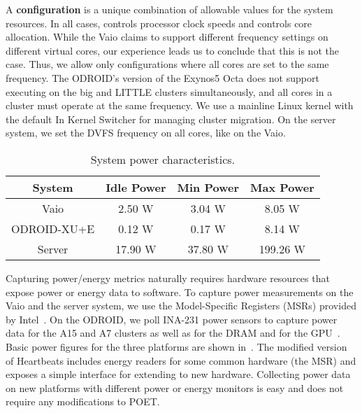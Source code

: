 A \textbf{configuration} is a unique combination of allowable values for the system resources.
In all cases,  controls processor clock speeds and  controls core allocation.
While the Vaio claims to support different frequency settings on different virtual cores, our experience leads us to conclude that this is not the case.
Thus, we allow only configurations where all cores are set to the same frequency.
The ODROID's version of the Exynos5 Octa does not support executing on the big and LITTLE clusters simultaneously, and all cores in a cluster must operate at the same frequency.
We use a mainline Linux kernel with the default In Kernel Switcher for managing cluster migration.
On the server system, we set the DVFS frequency on all cores, like on the Vaio.

\begin{table}[t]
\small
\centering
\caption{System power characteristics.}
\begin{tabular}{cccc}
  \textbf{System} & \textbf{Idle Power} & \textbf{Min Power} & \textbf{Max Power} \\
  \hline
  \hline
  Vaio        & 2.50 W  & 3.04 W  & 8.05 W \\
  ODROID-XU+E & 0.12 W  & 0.17 W  & 8.14 W \\
  Server      & 17.90 W & 37.80 W & 199.26 W \\
  \hline
  \hline
\end{tabular}
\label{tbl:poet-power}
\end{table}

Capturing power/energy metrics naturally requires hardware resources that expose power or energy data to software.
To capture power measurements on the Vaio and the server system, we use the Model-Specific Registers (MSRs) provided by Intel~\cite{SandyBridge}.
On the ODROID, we poll INA-231 power sensors to capture power data for the A15 and A7 clusters as well as for the DRAM and for the GPU~\cite{ina231}.
Basic power figures for the three platforms are shown in~.
The modified version of Heartbeats includes energy readers for some common hardware (\eg the MSR) and exposes a simple interface for extending to new hardware.
Collecting power data on new platforms with different power or energy monitors is easy and does not require any modifications to POET.

